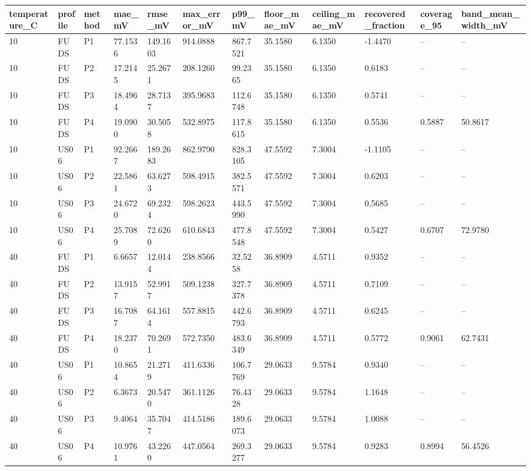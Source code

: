\begin{tabular}{llllllllllll}
\hline
temperature\_C & profile & method & mae\_mV & rmse\_mV & max\_error\_mV & p99\_mV & floor\_mae\_mV & ceiling\_mae\_mV & recovered\_fraction & coverage\_95 & band\_mean\_width\_mV \\
\hline
10 & FUDS & P1 & 77.1536 & 149.1603 & 914.0888 & 867.7521 & 35.1580 & 6.1350 & -1.4470 & -- & -- \\
10 & FUDS & P2 & 17.2145 & 25.2671 & 208.1260 & 99.2365 & 35.1580 & 6.1350 & 0.6183 & -- & -- \\
10 & FUDS & P3 & 18.4964 & 28.7137 & 395.9683 & 112.6748 & 35.1580 & 6.1350 & 0.5741 & -- & -- \\
10 & FUDS & P4 & 19.0900 & 30.5058 & 532.8975 & 117.8615 & 35.1580 & 6.1350 & 0.5536 & 0.5887 & 50.8617 \\
10 & US06 & P1 & 92.2667 & 189.2683 & 862.9790 & 828.3105 & 47.5592 & 7.3004 & -1.1105 & -- & -- \\
10 & US06 & P2 & 22.5861 & 63.6273 & 598.4915 & 382.5571 & 47.5592 & 7.3004 & 0.6203 & -- & -- \\
10 & US06 & P3 & 24.6720 & 69.2324 & 598.2623 & 443.5990 & 47.5592 & 7.3004 & 0.5685 & -- & -- \\
10 & US06 & P4 & 25.7089 & 72.6260 & 610.6843 & 477.8548 & 47.5592 & 7.3004 & 0.5427 & 0.6707 & 72.9780 \\
40 & FUDS & P1 & 6.6657 & 12.0144 & 238.8566 & 32.5258 & 36.8909 & 4.5711 & 0.9352 & -- & -- \\
40 & FUDS & P2 & 13.9157 & 52.9917 & 509.1238 & 327.7378 & 36.8909 & 4.5711 & 0.7109 & -- & -- \\
40 & FUDS & P3 & 16.7087 & 64.1614 & 557.8815 & 442.6793 & 36.8909 & 4.5711 & 0.6245 & -- & -- \\
40 & FUDS & P4 & 18.2370 & 70.2691 & 572.7350 & 483.6349 & 36.8909 & 4.5711 & 0.5772 & 0.9061 & 62.7431 \\
40 & US06 & P1 & 10.8654 & 21.2719 & 411.6336 & 106.7769 & 29.0633 & 9.5784 & 0.9340 & -- & -- \\
40 & US06 & P2 & 6.3673 & 20.5470 & 361.1126 & 76.4328 & 29.0633 & 9.5784 & 1.1648 & -- & -- \\
40 & US06 & P3 & 9.4064 & 35.7047 & 414.5186 & 189.6073 & 29.0633 & 9.5784 & 1.0088 & -- & -- \\
40 & US06 & P4 & 10.9761 & 43.2260 & 447.0564 & 269.3277 & 29.0633 & 9.5784 & 0.9283 & 0.8994 & 56.4526 \\
\hline
\end{tabular}
